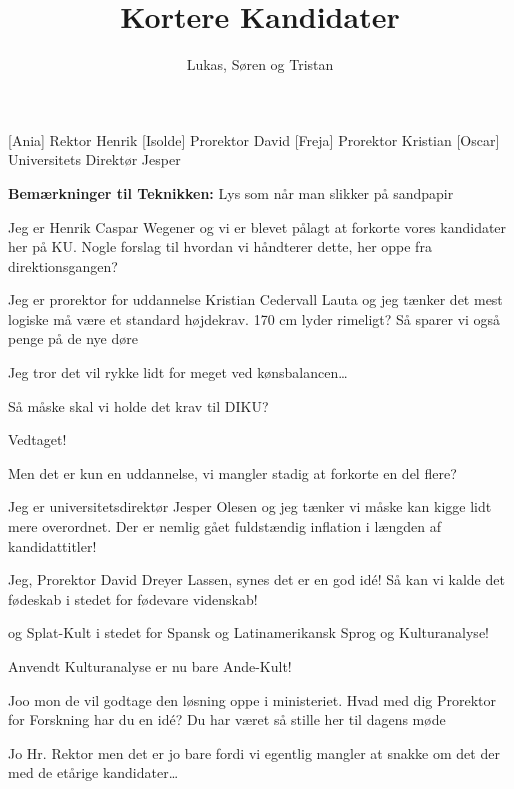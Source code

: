 \documentclass[a4paper,11pt]{article}
\title{Kortere Kandidater}
\author{Lukas, Søren og Tristan}
\begin{document}
\maketitle

\begin{roles}
    [Ania] Rektor Henrik
[Isolde] Prorektor David  
[Freja] Prorektor Kristian
[Oscar] Universitets Direktør Jesper  
\end{roles}

\textbf{Bemærkninger til Teknikken:} Lys som når man slikker på sandpapir

\begin{sketch}


 Jeg er Henrik Caspar Wegener og vi er blevet pålagt at forkorte vores kandidater her på KU. Nogle forslag til hvordan vi håndterer dette, her oppe fra direktionsgangen? 

 Jeg er prorektor for uddannelse Kristian Cedervall Lauta og jeg tænker det mest logiske må være et standard højdekrav. 170 cm lyder rimeligt? Så sparer vi også penge på de nye døre

 Jeg tror det vil rykke lidt for meget ved kønsbalancen…

 Så måske skal vi holde det krav til DIKU?

 Vedtaget!

 Men det er kun en uddannelse, vi mangler stadig at forkorte en del flere?

 Jeg er universitetsdirektør Jesper Olesen og jeg tænker vi måske kan kigge lidt mere overordnet. Der er nemlig gået fuldstændig inflation i længden af kandidattitler!

 Jeg, Prorektor David Dreyer Lassen, synes det er en god idé! Så kan vi kalde det fødeskab i stedet for fødevare videnskab!

 og Splat-Kult i stedet for Spansk og Latinamerikansk Sprog og Kulturanalyse!

 Anvendt Kulturanalyse er nu bare Ande-Kult!

 Joo mon de vil godtage den løsning oppe i ministeriet. Hvad med dig Prorektor for Forskning har du en idé? Du har været så stille her til dagens møde

 Jo Hr. Rektor men det er jo bare fordi vi egentlig mangler at snakke om det der med de etårige kandidater…


\end{sketch}
\end{document}
